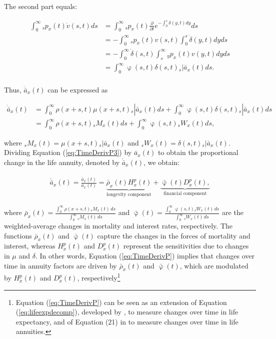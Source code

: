 \documentclass[12pt]{article}
\begin{document}
{The second part equals:

\begin{equation}\label{eq:TimeDerivP2}
\begin{split}
\int_0^\infty {}_sp_x(t) \dot{v}(s,t)ds &= \int_0^\infty {}_sp_x(t)  \frac{\partial  }{\partial t} e^{-\int_0^{s}{\delta}(y,t)dy}ds\\
&= -\int_0^\infty {}_sp_x(t) v(s,t) \int_0^{s}\dot{\delta}(y,t)dy ds\\
&= -\int_0^\infty  \dot{\delta}(s,t)\int_s^{\infty} {}_yp_x(t) v(y,t) dy ds\\
&= \int_0^\infty  \upvarphi(s,t) \delta(s,t)  {}_s|\bar{a}_x(t) ds.\\
\end{split}
\end{equation}


Thus, $\dot{\bar{a}} _x(t)$ can be expressed as


\begin{equation}\label{eq:TimeDerivP3}
\begin{split}
\dot{\bar{a}}_{x}(t) &=  \int_0^\infty \rho(x+s,t) \mu(x+s,t){}_s|\bar{a}_x(t) ds +\int_0^\infty  \upvarphi(s,t) \delta(s,t)  {}_s|\bar{a}_x(t) ds\\
&= \int_0^\infty \rho(x+s,t) {}_sM_x(t)  ds +\int_0^\infty  \upvarphi(s,t) {}_sW_x(t)  ds,
\end{split}
\end{equation}


where ${}_sM_x(t)= \mu(x+s,t){}_s|\bar{a}_x(t)$ and ${}_sW_x(t)=\delta(s,t)  {}_s|\bar{a}_x(t)$. Dividing Equation (\ref{eq:TimeDerivP3}) by $\bar{a}_x(t)$ to obtain the proportional change in the life annuity, denoted by $\acute{\bar{a}}_x(t)$, we obtain:


\begin{equation}\label{eq:TimeDerivP}
\begin{split}
 \acute{\bar{a}}_x(t) = \frac{\dot{\bar{a}}_x(t)}{\bar{a}_x(t)}  = 
 \underbrace{\bar{\rho}_x(t){H}^{p}_x(t)}_\text{longevity component}
 +\underbrace{\bar{\upvarphi}(t){D}^{p}_x(t),}_\text{financial component}
\end{split}
\end{equation}

where $\bar{\rho}_x(t) = \frac{\int_0^\infty \rho(x+s,t) {}_s M_x(t) \, ds}{\int_0^\infty {}_s M_x(t) \, ds}$ and 
$\bar{\upvarphi}(t) = \frac{\int_0^\infty \upvarphi(s,t) {}_s W_x(t) \, ds}{\int_0^\infty {}_s W_x(t) \, ds}$ are the weighted-average changes in mortality and interest rates, respectively. The functions $\bar{\rho}_x(t)$ and $\bar{\upvarphi}(t)$ capture the changes in the forces of mortality and interest, whereas ${H}^{p}_x(t)$ and ${D}^{p}_x(t)$ represent the sensitivities due to changes in $\mu$ and $\delta$. In other words, Equation (\ref{eq:TimeDerivP}) implies that changes over time in annuity factors are driven by $\bar{\rho}_x(t)$ and $\bar{\upvarphi}(t)$, which are modulated by ${H}^{p}_x(t)$ and ${D}^{p}_x(t)$, respectively\footnote{Equation (\ref{eq:TimeDerivP}) can be seen as an extension of Equation (\ref{eq:lifeexpdecomp}), developed by \citet{Vaupel2003}, to measure changes over time in life expectancy, and of Equation (21) in \citet{di2025decomposing} to measure changes over time in life annuities.}

}
\end{document}
